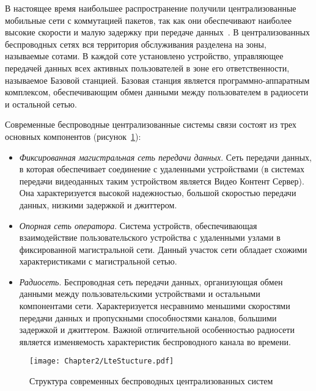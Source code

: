 В настоящее время наибольшее распространение получили централизованные мобильные сети с коммутацией пакетов, так как они обеспечивают наиболее высокие скорости и малую задержку при передаче данных~\cite{Cisco}. В централизованных беспроводных сетях вся территория обслуживания разделена на зоны, называемые сотами. В каждой соте установлено устройство, управляющее передачей данных всех активных пользователей в зоне его ответственности, называемое Базовой станцией. Базовая станция является программно-аппаратным комплексом, обеспечивающим обмен данными между пользователем в радиосети и остальной сетью.

Современные беспроводные централизованные системы связи состоят из трех основных компонентов (рисунок~\ref{fig:LteStructure}):
\begin{itemize}
  \item \textit{Фиксированная магистральная сеть передачи данных}. Сеть передачи данных, в которая обеспечивает соединение с удаленными устройствами (в системах передачи видеоданных таким устройством является Видео Контент Сервер). Она характеризуется высокой надежностью, большой скоростью передачи данных, низкими задержкой и джиттером.
  \item \textit{Опорная сеть оператора}. Система устройств, обеспечивающая взаимодействие пользовательского устройства с удаленными узлами в фиксированной магистральной сети. Данный участок сети обладает схожими характеристиками с магистральной сетью.
  \item \textit{Радиосеть}. Беспроводная сеть передачи данных, организующая обмен данными между пользовательскими устройствами и остальными компонентами сети. Характеризуется несравнимо меньшими скоростями передачи данных и пропускными способностями каналов, большими задержкой и джиттером. Важной отличительной особенностью радиосети является изменяемость характеристик беспроводного канала во времени.
\end{itemize}

\begin{figure}[htbp]
\begin{center}
\texttt{[image: Chapter2/LteStucture.pdf]}
\caption{Структура современных беспроводных централизованных систем}
\label{fig:LteStructure}
\end{center}
\end{figure}

